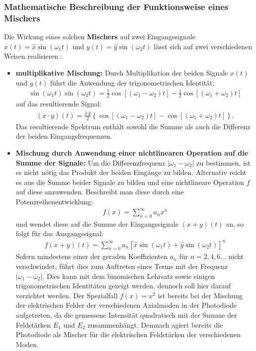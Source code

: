 \documentclass[11pt, a4paper]{article}
\numberwithin{equation}{section}
\begin{document}
\subsubsection{Mathematische Beschreibung der Funktionsweise eines Mischers}
Die Wirkung eines solchen \textbf{Mischers} auf zwei Eingangssignale $x(t) = \hat{x} \sin(\omega_1 t)$ und $y(t) = \hat{y} \sin(\omega_2 t)$ lässt sich auf zwei verschiedenen Weisen realisieren \cite{horowitz_hill}:
\begin{itemize}
	\item \textbf{multiplikative Mischung:} Durch Multiplikation der beiden Signale $x(t)$ und $y(t)$ führt die Anwendung der trigonometrischen Identität:
	\begin{align}
		\sin(\omega_1 t) \sin(\omega_2 t) = \frac{1}{2} \cos\left[ (\omega_1 - \omega_2) t \right] - \frac{1}{2} \cos\left[ (\omega_1 + \omega_2) t\right]
	\end{align}
	auf das resultierende Signal:
	\begin{align}
		(x\cdot y)(t) = \frac{\hat{x} \, \hat{y}}{2} \left\{ \cos\left[ (\omega_1 - \omega_2) t \right] - \cos\left[ (\omega_1 + \omega_2) t\right]\right\} \text{.}
	\end{align}
	Das resultierende Spektrum enthält sowohl die Summe als auch die Differenz der beiden Eingangsfrequenzen.
	\item \textbf{Mischung durch Anwendung einer nichtlinearen Operation auf die Summe der Signale:} Um die Differenzfrequenz $|\omega_1 - \omega_2|$ zu bestimmen, ist es nicht nötig das Produkt der beiden Eingänge zu bilden.
	Alternativ reicht es aus die Summe beider Signale zu bilden und eine nichtlineare Operation $f$ auf diese anzuwenden.
	Beschreibt man diese durch eine Potenzreihenentwicklung:
	\begin{align}
		f(x) = \sum_{n=0}^{\infty} a_n x^n
	\end{align}
	und wendet diese auf die Summe der Eingangssignale $(x+y)(t)$ an, so folgt für das Ausgangssignal:
	\begin{align}
		f(x+y)(t) = \sum_{n=0}^{\infty} a_n \left[ \hat{x} \sin(\omega_1 t) + \hat{y} \sin(\omega_2 t) \right]^n
	\end{align}
	Sofern mindestens einer der geraden Koeffizienten $a_n$ für $n = 2, 4, 6\dots$ nicht verschwindet, führt dies zum Auftreten eines Terms mit der Frequenz $|\omega_1 - \omega_2|$.
	Dies kann mit dem binomischen Lehrsatz sowie einigen trigonometrischen Identitäten gezeigt werden, dennoch soll hier darauf verzichtet werden.
	Der Spezialfall $f(x) = x^2$ ist bereits bei der Mischung der elektrischen Felder der verschiedenen Axialmoden in der Photodiode aufgetreten, da die gemessene Intensität quadratisch mit der Summe der Feldstärken $E_1$ und $E_2$ zusammenhängt.
	Demnach agiert bereits die Photodiode als Mischer für die elektrischen Feldstärken der verschiedenen Moden.
\end{itemize}
\end{document}
